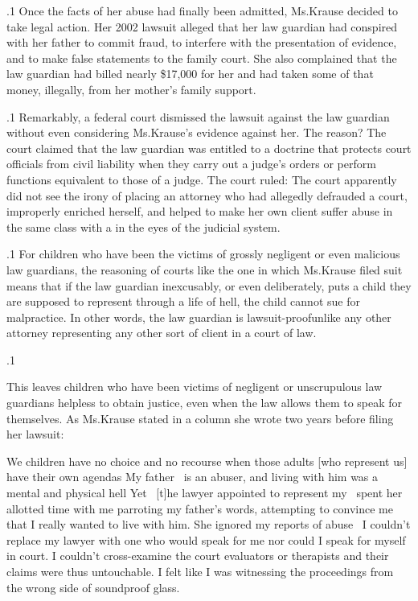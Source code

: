 \documentclass[11pt, twoside]{article}
\begin{document}
{\p.1{%
Once the facts of her abuse had finally been admitted, Ms.\@ Krause decided to take legal action. Her 2002 lawsuit alleged that her law guardian
had conspired with her father to commit fraud, to interfere with the presentation of evidence, and to make false statements to the family court.
She also complained that the law guardian had billed nearly \$17,000
for her  and had taken some of that money, illegally, from her
mother’s family support.
}%

\p.1{%
Remarkably, a federal court dismissed the lawsuit against the law
guardian without even considering Ms.\@ Krause’s evidence against her.
The reason? The court claimed that the law guardian was entitled to
 a doctrine that protects court officials from
civil liability when they carry out a judge’s orders or perform functions
equivalent to those of a judge. The court ruled:  The court
apparently did not see the irony of placing an attorney who had allegedly
defrauded a court, improperly enriched herself, and helped to make her
own client suffer abuse in the same class with a  in the eyes
of the judicial system.
}%

\p.1{%
For children who have been the victims of grossly negligent or even
malicious law guardians, the reasoning of courts like the one in which
Ms.\@ Krause filed suit means that if the law guardian inexcusably, or even
deliberately, puts a child they are supposed to represent through a life
of hell, the child cannot sue for malpractice. In other words, the law
guardian is lawsuit-proof\mdash{}unlike any other attorney representing any
other sort of client in a court of law.
}%

\p.1{%
This leaves children who have been victims of negligent or unscrupulous law guardians helpless to obtain justice, even when the law allows
them to speak for themselves. As Ms.\@ Krause stated in a column she
wrote two years before filing her lawsuit:

\begin{blockQuote}
We children have no choice and no recourse when those adults
[who represent us] have their own agendas\ellFour{2pt}{2pt} My father \ellThree{2pt}{2pt}\ is
an abuser, and living with him was a mental and physical hell\ellFour{2pt}{2pt}
Yet \ellThree{2pt}{2pt}\ [t]he lawyer appointed to represent my  \ellThree{2pt}{2pt}\
spent her allotted time with me parroting my father’s words, attempting to convince me that I really wanted to live with him. She
ignored my reports of abuse\ellFour{2pt}{2pt}
\parbreak{}
\ellThree{2pt}{2pt}\ I couldn’t replace my lawyer with one who would speak for
me nor could I speak for myself in court. I couldn’t cross-examine
the court evaluators or therapists and their claims were thus untouchable. I felt like I was witnessing the proceedings from the
wrong side of soundproof glass.\fnm{56}
\end{blockQuote}

}}
\end{document}

